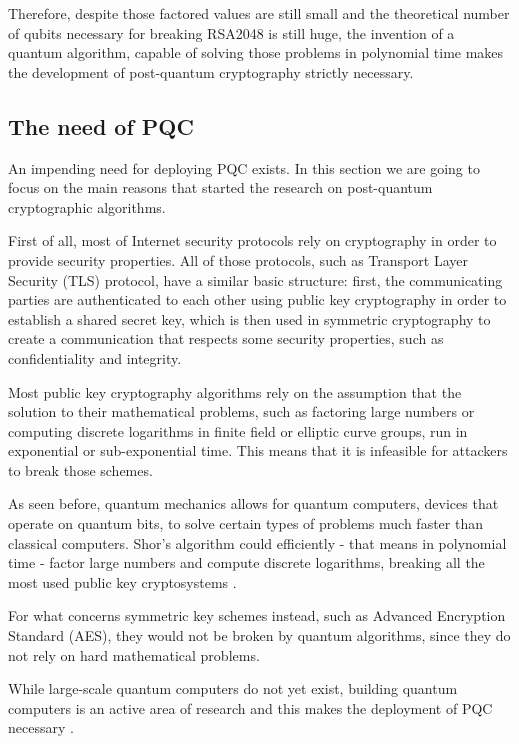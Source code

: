 \documentclass[a4paper,12pt]{article}
\begin{document}
Therefore, despite those factored values are still small and the theoretical number of qubits necessary for breaking RSA2048 is still huge, the invention of a quantum algorithm, capable of solving those problems in polynomial time makes the development of post-quantum cryptography strictly necessary.

\subsection{The need of PQC}
\label{sub:needPQC}

An impending need for deploying PQC exists. In this section we are going to focus on the main reasons that started the research on post-quantum cryptographic algorithms.

First of all, most of Internet security protocols rely on cryptography in order to provide security properties. All of those protocols, such as Transport Layer Security (TLS) protocol, have a similar basic structure: first, the communicating parties are authenticated to each other using public key cryptography in order to establish a shared secret key, which is then used in symmetric cryptography to create a communication that respects some security properties, such as confidentiality and integrity.

Most public key cryptography algorithms rely on the assumption that the solution to their mathematical problems, such as factoring large numbers or computing discrete logarithms in finite field or elliptic curve groups, run in exponential or sub-exponential time. This means that it is infeasible for attackers to break those schemes.

As seen before, quantum mechanics allows for quantum computers, devices that operate on quantum bits, to solve certain types of problems much faster than classical computers. Shor's algorithm could efficiently - that means in polynomial time - factor large numbers and compute discrete logarithms, breaking all the most used public key cryptosystems \cite{10_postquantum_keyexchange}.

For what concerns symmetric key schemes instead, such as Advanced Encryption Standard (AES), they would not be broken by quantum algorithms, since they do not rely on hard mathematical problems.

While large-scale quantum computers do not yet exist, building quantum computers is an active area of research and this makes the deployment of PQC necessary \cite{10_postquantum_keyexchange}.
\end{document}
